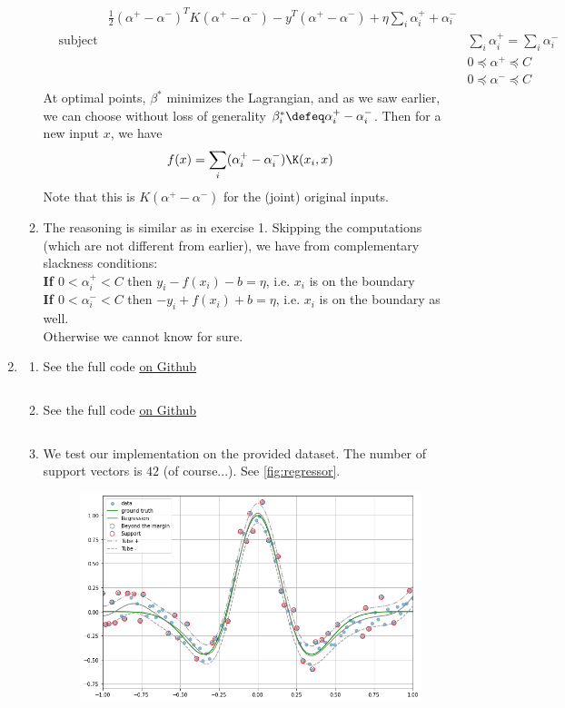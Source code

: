 \documentclass[french]{article}
\begin{document}
\begin{enumerate}
\begin{enumerate}
\begin{equation*}
\begin{aligned}
    & &  \frac{1}{2}(\alpha^+ - \alpha^-)^T K (\alpha^+ - \alpha^-) - y^T (\alpha^+ - \alpha^-) + \eta \sum_i \alpha_i^+ + \alpha_i^-\\
    & \text{subject to}
    & & \sum_i \alpha_i^+ = \sum_i \alpha_i^- \\
    & & & 0 \preceq \alpha^+ \preceq C\\
    & & & 0 \preceq \alpha^- \preceq C
    \end{aligned}
    \end{equation*}
    At optimal points, $\beta^*$ minimizes the Lagrangian, and as we saw earlier, we can choose without loss of generality $\beta^*_i \defeq \alpha^+_i - \alpha^-_i$. Then for a new input $x$, we have
    \[ f(x) = \sum_i (\alpha^+_i - \alpha^-_i) \K(x_i, x)
    \]
    Note that this is $K(\alpha^+ - \alpha^-)$ for the (joint) original inputs.
    \item The reasoning is similar as in exercise 1. Skipping the computations (which are not different from earlier), we have from complementary slackness conditions:\\
    \textbf{If $0 < \alpha^+_i < C$} then $y_i - f(x_i) - b = \eta$, i.e. $x_i$ is on the boundary\\
    \textbf{If $0 < \alpha^-_i < C$} then $-y_i + f(x_i) + b = \eta$, i.e. $x_i$ is on the boundary as well.\\
    Otherwise we cannot know for sure.
    \end{enumerate}
\item
    \begin{enumerate}
    \item See the full code \href{https://github.com/gbelouze/mva-kernel-hw3/blob/b57749258006dcfc57c9f2e233fad94ef4b50f47/src/hw3/models/classify.py#L137}{on Github}
    \inputminted{python}{snippets/ex2_q2a.py}
    \item See the full code \href{https://github.com/gbelouze/mva-kernel-hw3/blob/b57749258006dcfc57c9f2e233fad94ef4b50f47/src/hw3/models/classify.py#L209}{on Github}
    \inputminted{python}{snippets/ex2_q2b.py}
    \item We test our implementation on the provided dataset. The number of support vectors is
    $42$ (of course...). See \autoref{fig:regressor}.
    \begin{figure}
        \centering
        \includegraphics[width=\textwidth]{figures/regressor.png}

\end{figure}
\end{enumerate}
\end{enumerate}
\end{document}
